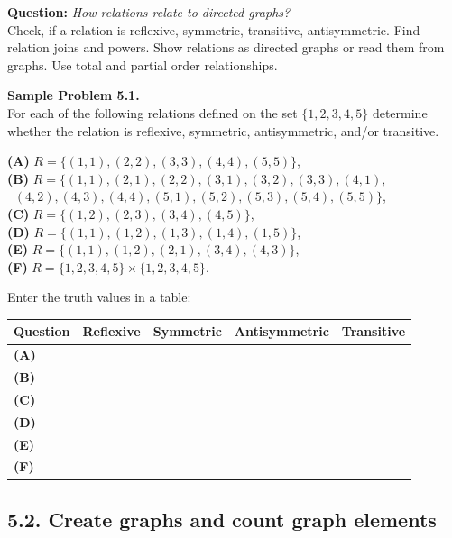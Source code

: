 \documentclass[jou]{apa6}
\begin{document}
{\bf Question:} {\em How relations relate to directed graphs?}\\
{\scriptsize
Check, if a relation is reflexive, symmetric, transitive, antisymmetric. Find relation joins and powers. Show relations as directed graphs or read them from graphs. Use total and partial order relationships.
}



\vspace{6pt}
{\bf Sample Problem 5.1.}\\
For each of the following relations defined on the set $\{ 1,2,3,4,5 \}$ determine whether
the relation is reflexive, symmetric, antisymmetric, and/or transitive. 


{\bf (A)} $R = \{ (1,1), (2,2), (3,3), (4,4), (5,5) \}$,\\
{\bf (B)} $R = \{ (1,1), (2,1), (2,2), (3,1), (3,2), (3,3), (4,1),$\\
\mbox{}$\;\;(4,2),(4,3), (4,4), (5,1), (5,2), (5,3), (5,4), (5,5) \}$,\\
{\bf (C)} $R = \{ (1,2), (2,3), (3,4), (4,5) \}$,\\
{\bf (D)} $R = \{ (1,1), (1,2), (1,3), (1,4), (1,5) \}$,\\
{\bf (E)} $R = \{ (1,1), (1,2), (2,1), (3,4), (4,3) \}$,\\
{\bf (F)} $R = \{ 1,2,3,4,5 \} \times \{ 1,2,3,4,5 \}$. 

Enter the truth values in a table: 

\begin{tabular}{|l|c|c|c|c|} \hline
{\scriptsize Question} & {\scriptsize Reflexive} & {\scriptsize Symmetric} & {\scriptsize Antisymmetric} & {\scriptsize Transitive} \\ \hline
{\bf (A)} & & & & \\ \hline
{\bf (B)} & & & & \\ \hline
{\bf (C)} & & & & \\ \hline
{\bf (D)} & & & & \\ \hline
{\bf (E)} & & & & \\ \hline
{\bf (F)} & & & & \\ \hline
\end{tabular}



\subsection{5.2. Create graphs and count graph elements}
\end{document}
